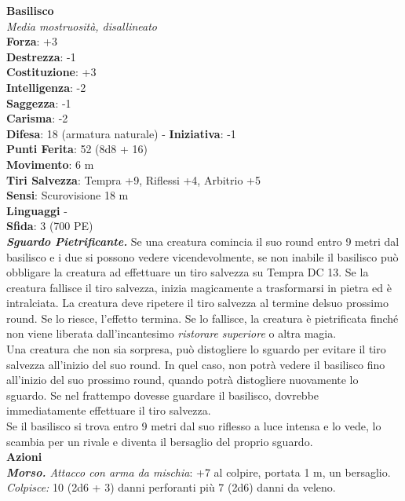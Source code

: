 \begin{multicols}{2}
\medskip\textbf{Basilisco}\\
\emph{Media mostruosità, disallineato}\\
\textbf{Forza}: +3\\
\textbf{Destrezza}: -1\\
\textbf{Costituzione}: +3\\
\textbf{Intelligenza}: -2\\
\textbf{Saggezza}: -1\\
\textbf{Carisma}: -2\\
\textbf{Difesa}: 18 (armatura naturale) - \textbf{Iniziativa}: -1\\
\textbf{Punti Ferita}: 52 (8d8 + 16)\\
\textbf{Movimento}: 6 m\\
\textbf{Tiri Salvezza}: Tempra +9, Riflessi +4, Arbitrio +5\\
\textbf{Sensi}: Scurovisione 18 m\\
\textbf{Linguaggi} -\\
\textbf{Sfida}: 3 (700 PE)\smallskip\\
\emph{\textbf{Sguardo Pietrificante.}} Se una creatura comincia il suo round entro 9 metri dal basilisco e i due si possono vedere vicendevolmente, se non inabile il basilisco può obbligare la creatura ad effettuare un tiro salvezza su Tempra DC  13. Se la creatura fallisce il tiro  salvezza, inizia magicamente a trasformarsi in pietra ed è   intralciata. La creatura deve ripetere il tiro salvezza al termine delsuo prossimo round. Se lo riesce, l'effetto termina. Se lo fallisce,   la creatura è pietrificata finché non viene liberata dall'incantesimo  \emph{ristorare} \emph{superiore} o altra magia. \\
Una creatura che non sia sorpresa, può distogliere lo sguardo per evitare il tiro salvezza all'inizio del suo round. In quel caso, non potrà vedere il basilisco fino all'inizio del suo prossimo round, quando potrà distogliere nuovamente lo sguardo. Se nel frattempo dovesse guardare il basilisco, dovrebbe immediatamente effettuare il tiro salvezza.\\
Se il basilisco si trova entro 9 metri dal suo riflesso a luce intensa e lo vede, lo scambia per un rivale e diventa il bersaglio del proprio sguardo.\\
\smallskip\textbf{Azioni}\\
\emph{\textbf{Morso.} Attacco con arma da mischia}: +7 al colpire, portata 1 m, un bersaglio. \\
\emph{Colpisce:} 10 (2d6 + 3) danni perforanti più 7 (2d6) danni da veleno.\\

\end{multicols}
